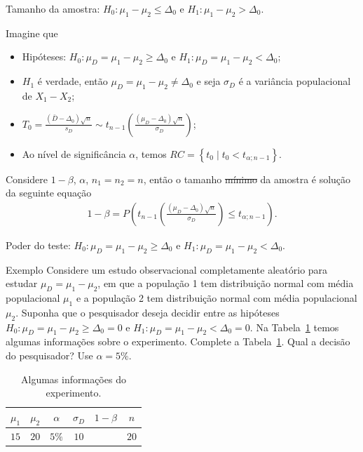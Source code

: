 \documentclass[9pt]{beamer}
\begin{document}
\begin{frame}{Tamanho da amostra: $H_0:\mu_1 - \mu_2 \leq \Delta_0$ e $H_1: \mu_1 - \mu_2 > \Delta_0$.}

\normalsize
Imagine que
\begin{itemize}
	\item Hipóteses: $H_0:\mu_D= \mu_1 - \mu_2 \geq \Delta_0$ e $H_1:\mu_D= \mu_1 -  \mu_2 < \Delta_0$;
	\item $H_1$ é verdade, então $\mu_D = \mu_1-\mu_2 \neq \Delta_0$ e seja $\sigma_D$ é a variância populacional de $X_1 - X_2$;
	\item $T_0 = \frac{(\bar{D} - \Delta_0)\sqrt{n}}{s_D} \sim t_{n-1}\left( \frac{(\mu_D - \Delta_0)\sqrt{n}}{\sigma_D} \right)$;
	\item Ao nível de significância $\alpha$, temos $RC = \left\{ t_0 \mid t_0 < t_{\alpha;n-1}  \right\}$.
\end{itemize}
\vfill

Considere $1-\beta$, $\alpha$, $n_1=n_2=n$, então o tamanho \sout{mínimo} da amostra é solução da seguinte equação
\scriptsize
\begin{align*}
1-\beta = P\left( t_{n-1}\left( \frac{(\mu_D - \Delta_0)\sqrt{n}}{\sigma_D} \right) \leq t_{\alpha;n-1} \right).
\end{align*}

\normalsize
\end{frame}

\begin{frame}{Poder do teste: $H_0:\mu_D = \mu_1 - \mu_2 \geq \Delta_0$ e $H_1:\mu_D =  \mu_1 - \mu_2 < \Delta_0$.}

\begin{block}{Exemplo}
	Considere um estudo observacional completamente aleatório para estudar $\mu_D = \mu_1 - \mu_2$, em que a população 1 tem distribuição normal com média populacional $\mu_1$ e a população 2 tem distribuição normal com média populacional $\mu_2$. Suponha que o pesquisador deseja decidir entre as hipóteses $H_0:\mu_D = \mu_1 - \mu_2 \geq \Delta_0=0$ e $H_1: \mu_D = \mu_1 - \mu_2 < \Delta_0=0$. Na Tabela~\ref{tab:test-t-pareado-h1-upper-power} temos algumas informações sobre o experimento. Complete a Tabela~\ref{tab:test-t-pareado-h1-upper-power}. Qual a decisão do pesquisador? Use $\alpha = 5\%$.
	
	\begin{table}[htbp]
		\centering
		\begin{tabular}{c|c|c|c|c|c}
			\toprule[0.05cm]
			$\mu_1$ & $\mu_2$ & $\alpha$ & 			$\sigma_D$ & $1-\beta$ & $n$ \\ \midrule[0.025cm]
			$15$ & $20$ & $5\%$ & $10$ &  & $20$  \\ \bottomrule[0.05cm]
		\end{tabular}
		\caption{Algumas informações do experimento.}
		\label{tab:test-t-pareado-h1-upper-power}
	\end{table}
\end{block}

\end{frame}
\end{document}
